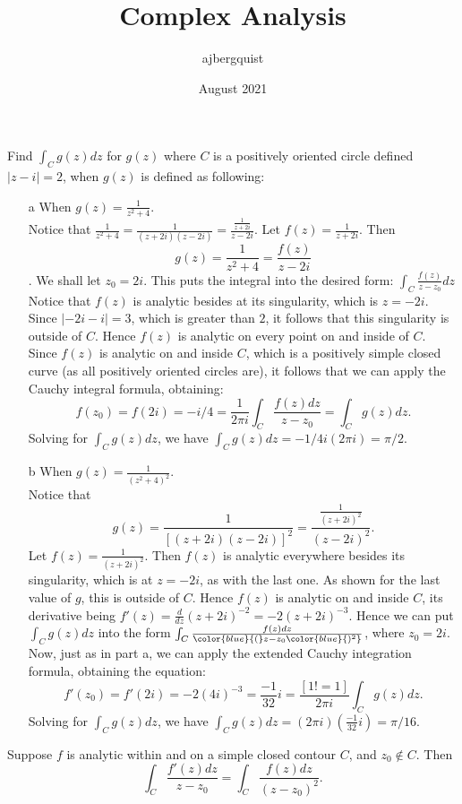 \documentclass{article}
\title{Complex Analysis}
\author{ajbergquist }
\date{August 2021}
\theoremstyle{definition}
\newcommand{\cs}[1]{\color{blue}{#1}\normalcolor}
\begin{document}
 Find $\int_Cg(z)dz$ for $g(z)$ where $C$ is a positively oriented circle defined $|z-i| = 2$, when $g(z)$ is defined as following:\\
\begin{itemize}
    \item[a] When $g(z) = \frac{1}{z^2+4}$.\\
     Notice that $\frac{1}{z^2+4} = \frac{1}{(z+2i)(z-2i)} = \frac{\frac{1}{z+2i}}{z-2i}$. Let $f(z) = \frac{1}{z+2i}$. Then $$g(z) = \frac{1}{z^2 + 4} = \frac{f(z)}{z-2i}$$. We shall let $z_0 = 2i$. This puts the integral into the desired form: $\int_C\frac{f(z)}{z-z_0}dz$\\
    Notice that $f(z)$ is analytic besides at its singularity, which is $z = -2i$. Since $|-2i-i| = 3$, which is greater than $2$, it follows that this singularity is outside of $C$. Hence $f(z)$ is analytic on every point on and inside of $C$.\\
    Since $f(z)$ is analytic on and inside $C$, which is a positively simple closed curve (as all positively oriented circles are), it follows that we can apply the Cauchy integral formula, obtaining:
    $$f(z_0) = f(2i) = -i/4 = \frac{1}{2\pi i}\int_C\frac{f(z)dz}{z-z_0} = \int_Cg(z)dz.$$
    Solving for $\int_Cg(z)dz$, we have $\int_Cg(z)dz = -1/4i(2\pi i) = \pi/2$.
    
    \cs{5/5}
    
    \item[b] When $g(z) = \frac{1}{(z^2+4)^2}$.\\
     Notice that $$g(z) = \frac{1}{[(z+2i)(z-2i)]^2} = \frac{\frac{1}{(z+2i)^2}}{(z-2i)^2}.$$ Let $f(z) = \frac{1}{(z+2i)^2}$. Then $f(z)$ is analytic everywhere besides its singularity, which is at $z= -2i$, as with the last one. As shown for the last value of $g$, this is outside of $C$. Hence $f(z)$ is analytic on and inside $C$, its derivative being $f'(z) = \frac{d}{dz}(z+2i)^{-2} = -2(z+2i)^{-3}$. Hence we can put $\int_Cg(z)dz$ into the form $\int_C\frac{f(z)dz}{\cs{(}z-z_0\cs{)^2}}$, where $z_0 = 2i$. Now, just as in part a, we can apply the extended Cauchy integration formula, obtaining the equation:
    $$f'(z_0) = f'(2i) = -2(4i)^{-3} = \frac{-1}{32}i = \frac{[1!=1]}{2\pi i}\int_Cg(z)dz.$$ Solving for $\int_Cg(z)dz$, we have $\int_Cg(z)dz = (2\pi i)(\frac{-1}{32}i) = \pi/16$.
    
    \cs{5/5}
\end{itemize}

 Suppose $f$ is analytic within and on a simple closed contour $C$, and $z_0\not \in C$. Then $$\int_C\frac{f'(z)dz}{z-z_0} = \int_C\frac{f(z)dz}{(z-z_0)^2}.$$\\
\end{document}
